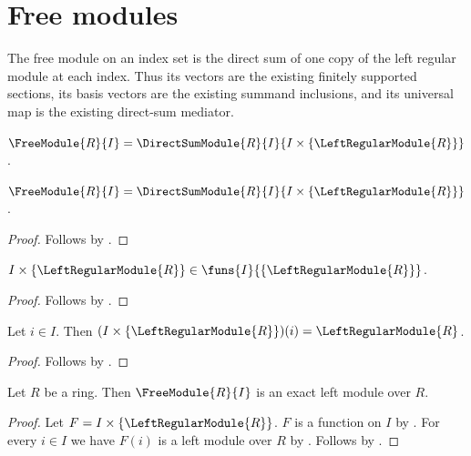 



\section{Free modules}

The free module on an index set is the direct sum of one copy of the left
regular module at each index.  Thus its vectors are the existing finitely
supported sections, its basis vectors are the existing summand inclusions,
and its universal map is the existing direct-sum mediator.

\begin{definition}\label{free_module}
    $\FreeModule{R}{I}
        =\DirectSumModule{R}{I}{I\times\{\LeftRegularModule{R}\}}$.
\end{definition}

\begin{proposition}\label{free_module_constructor_eq}
    $\FreeModule{R}{I}
        =\DirectSumModule{R}{I}{I\times\{\LeftRegularModule{R}\}}$.
\end{proposition}
\begin{proof}
    Follows by .
\end{proof}


\begin{proposition}\label{free_module_regular_family_type}
    $I\times\{\LeftRegularModule{R}\}\in
        \funs{I}{\{\LeftRegularModule{R}\}}$.
\end{proposition}
\begin{proof}
    Follows by .
\end{proof}

\begin{proposition}\label{free_module_regular_family_apply}
    Let $i\in I$.
    Then $(I\times\{\LeftRegularModule{R}\})(i)
        =\LeftRegularModule{R}$.
\end{proposition}
\begin{proof}
    Follows by .
\end{proof}

\begin{theorem}\label{free_module_is_exact}
    Let $R$ be a ring.
    Then $\FreeModule{R}{I}$ is an exact left module over $R$.
\end{theorem}
\begin{proof}
    Let $F=I\times\{\LeftRegularModule{R}\}$.
    $F$ is a function on $I$ by
        .
    For every $i\in I$ we have $F(i)$ is a left module over $R$ by
        .
    Follows by
        .
\end{proof}

